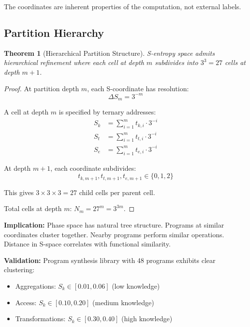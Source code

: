 \documentclass[twocolumn,10pt]{article}
\newtheorem{theorem}{Theorem}[section]
\theoremstyle{definition}
\theoremstyle{remark}
\newcommand{\Sk}{S_k}
\newcommand{\St}{S_t}
\newcommand{\Se}{S_e}
\begin{document}
The coordinates are inherent properties of the computation, not external labels.

\subsection{Partition Hierarchy}

\begin{theorem}[Hierarchical Partition Structure]
\label{thm:hierarchy}
S-entropy space admits hierarchical refinement where each cell at depth $m$ subdivides into $3^3 = 27$ cells at depth $m+1$.
\end{theorem}

\begin{proof}
At partition depth $m$, each S-coordinate has resolution:
\begin{equation}
\Delta S_m = 3^{-m}
\end{equation}

A cell at depth $m$ is specified by ternary addresses:
\begin{align}
\Sk &= \sum_{i=1}^{m} t_{k,i} \cdot 3^{-i} \\
\St &= \sum_{i=1}^{m} t_{t,i} \cdot 3^{-i} \\
\Se &= \sum_{i=1}^{m} t_{e,i} \cdot 3^{-i}
\end{align}

At depth $m+1$, each coordinate subdivides:
\begin{equation}
t_{k,m+1}, t_{t,m+1}, t_{e,m+1} \in \{0, 1, 2\}
\end{equation}

This gives $3 \times 3 \times 3 = 27$ child cells per parent cell.

Total cells at depth $m$: $N_m = 27^m = 3^{3m}$.
\end{proof}

\vspace{0.2cm}
\noindent\textbf{Implication:} Phase space has natural tree structure. Programs at similar coordinates cluster together. Nearby programs perform similar operations. Distance in S-space correlates with functional similarity.

\vspace{0.2cm}
\noindent\textbf{Validation:} Program synthesis library with 48 programs exhibits clear clustering:
\begin{itemize}
\item Aggregations: $\Sk \in [0.01, 0.06]$ (low knowledge)
\item Access: $\Sk \in [0.10, 0.20]$ (medium knowledge)
\item Transformations: $\Sk \in [0.30, 0.40]$ (high knowledge)
\end{itemize}
\end{document}
